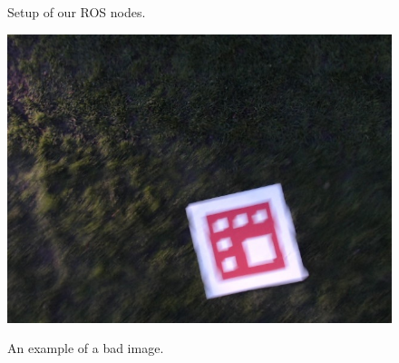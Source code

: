 \documentclass[10pt]{scrartcl} %
\begin{document}
\begin{figure}
\begin{minipage}{0.5\textwidth}
        \caption{Setup of our ROS nodes.}
        \label{fig:rosnodes}
        \vspace{2cm}
        \includegraphics[width=0.9\linewidth]{images/badimage.jpg}
        \caption{An example of a bad image.}
        \label{fig:badimage}
    \end{minipage}
\end{figure}
\end{document}
